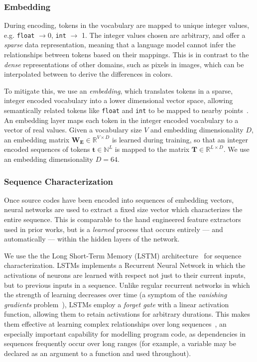 

\subsubsection{Embedding} During encoding, tokens in the vocabulary are mapped to unique integer values, e.g. \texttt{float} $\rightarrow 0$, \texttt{int} $\rightarrow$ 1. The integer values chosen are arbitrary, and offer a \emph{sparse} data representation, meaning that a language model cannot infer the relationships between tokens based on their mappings. This is in contrast to the \emph{dense} representations of other domains, such as pixels in images, which can be interpolated between to derive the differences in colors.

To mitigate this, we use an \emph{embedding}, which translates tokens in a sparse, integer encoded vocabulary into a lower dimensional vector space, allowing semantically related tokens like \texttt{float} and \texttt{int} to be mapped to nearby points~\cite{Mikolov2013a,Baroni2014}. An embedding layer maps each token in the integer encoded vocabulary to a vector of real values. Given a vocabulary size $V$ and embedding dimensionality $D$, an embedding matrix $\bm{W_{E}} \in \mathbb{R}^{V \times D}$ is learned during training, so that an integer encoded sequences of tokens $\bm{t} \in \mathbb{N}^{L}$ is mapped to the matrix $\bm{T} \in \mathbb{R}^{L \times D}$. We use an embedding dimensionality $D = 64$.

\subsubsection{Sequence Characterization} Once source codes have been encoded into sequences of embedding vectors, neural networks are used to extract a fixed size vector which characterizes the entire sequence. This is comparable to the hand engineered feature extractors used in prior works, but is a \emph{learned} process that occurs entirely --- and automatically --- within the hidden layers of the network.

We use the the Long Short-Term Memory (LSTM) architecture~\cite{Hochreiter1997} for sequence characterization. LSTMs implements a Recurrent Neural Network in which the activations of neurons are learned with respect not just to their current inputs, but to previous inputs in a sequence. Unlike regular recurrent networks in which the strength of learning decreases over time (a symptom of the \emph{vanishing gradients} problem~\cite{Pacanu2013}), LSTMs employ a \emph{forget gate} with a linear activation function, allowing them to retain activations for arbitrary durations. This makes them effective at learning complex relationships over long sequences~\cite{Lipton2015}, an especially important capability for modelling program code, as dependencies in sequences frequently occur over long ranges (for example, a variable may be declared as an argument to a function and used throughout).

